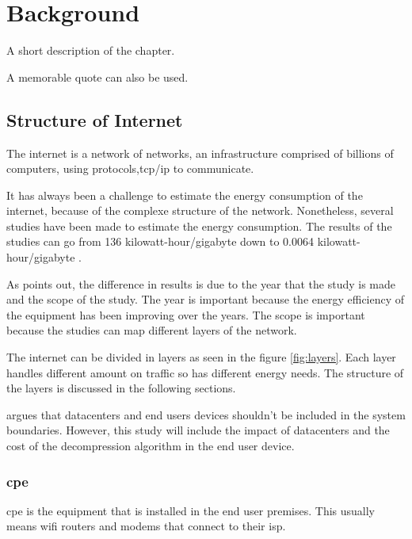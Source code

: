 

\chapter{Background}
\label{chapter:background}

\begin{introduction}
A short description of the chapter.

A memorable quote can also be used.
\end{introduction}

\section{Structure of Internet}

The internet is a network of networks, an infrastructure comprised of billions of computers, 
using protocols,\ac{tcp}/\ac{ip} to communicate.

It has always been a challenge to estimate the energy consumption of the internet, because of the complexe structure of the network. Nonetheless, several studies have been made to estimate the energy consumption. The results of the studies can go from 136 \ac{kilowatt-hour}/\ac{gigabyte}
\citet{Koomey2003} down to 0.0064 \ac{kilowatt-hour}/\ac{gigabyte} \citet{Baliga2011}.

As \citet{Coroama2015} points out, the difference in results is due to the year that the study is made and the scope of the study. 
The year is important because the energy efficiency of the equipment has been improving over the years. 
The scope is important because the studies can map different layers of the network.

The internet can be divided in layers as seen in the figure \ref{fig:layers}. 
Each layer handles different amount on traffic so has different energy needs.
The structure of the layers is discussed in the following sections.

\citet{Coroama2014} argues that datacenters and end users devices shouldn't be included in the system boundaries. However, this study will include the impact of datacenters and the cost of the decompression algorithm in the end user device.

\subsection{\acl{cpe}}

\ac{cpe} is the equipment that is installed in the end user premises. This usually means wifi routers and modems that connect to their \ac{isp}.


